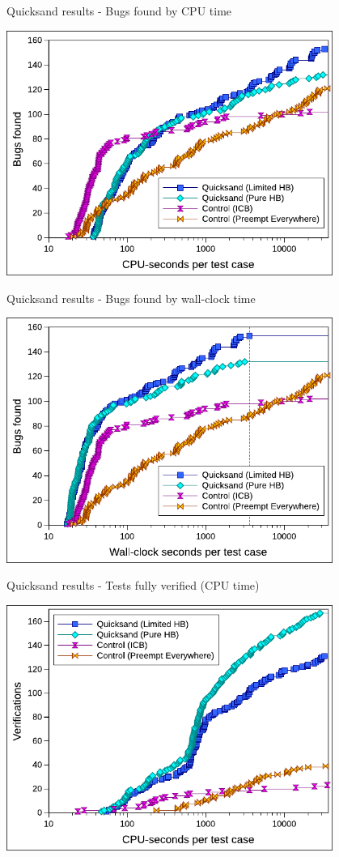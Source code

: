 \documentclass[xcolor=dvipsnames]{beamer}
\begin{document}
\begin{frame}{Quicksand results - Bugs found by CPU time}
	\begin{center}
		\includegraphics[width=0.8\textwidth]{../../oopsla/bugs-talk.pdf}
	\end{center}
\end{frame}
\begin{frame}{Quicksand results - Bugs found by wall-clock time}
	\begin{center}
		\includegraphics[width=0.8\textwidth]{../../oopsla/bugs-wallclock-talk.pdf}
	\end{center}
\end{frame}
\begin{frame}{Quicksand results - Tests fully verified (CPU time)}
	\begin{center}
		\includegraphics[width=0.8\textwidth]{../../oopsla/verifs-talk.pdf}
	\end{center}
\end{frame}
\end{document}

